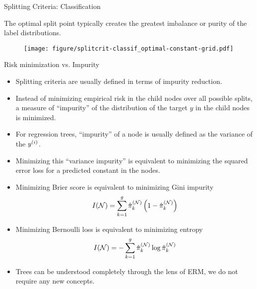 \documentclass[11pt,compress,t,notes=noshow, xcolor=table]{beamer}
\begin{document}
\begin{frame}[b]{Splitting Criteria: Classification}

The optimal split point typically creates the greatest imbalance or purity of the label distributions.

\vspace{0.5cm}

\begin{figure}[b]
    \centering
  \texttt{[image: figure/splitcrit-classif\_optimal-constant-grid.pdf]}
\end{figure}
\end{frame}

\begin{vbframe}{Risk minimization vs. Impurity}

\begin{itemize}
\item Splitting criteria are usually defined in terms of impurity reduction. 
\item Instead of minimizing empirical risk in the child nodes over all possible splits, a measure of \enquote{impurity} of the distribution of the target $y$ in the child nodes is minimized. 
\item For regression trees, \enquote{impurity} of a node is usually defined as the variance of the $y^{(i)}$. 
\item Minimizing this \enquote{variance impurity} is equivalent to minimizing the squared error loss for a predicted constant in the nodes. 

\framebreak 

\item Minimizing Brier score is equivalent to minimizing  Gini impurity
$$I(\mathcal{N}) = \sum\limits_{k=1}^g \hat\pi_k^{(\mathcal{N})} \left( 1-\hat\pi_k^{(\mathcal{N})} \right)$$
\item Minimizing Bernoulli loss is equivalent to minimizing entropy
$$I(\mathcal{N}) = -\sum\limits_{k=1}^g \hat\pi_k^{(\mathcal{N})} \log \hat\pi_k^{(\mathcal{N})}$$
\item Trees can be understood completely through the lens of ERM, we do not require any new concepts.
\end{itemize}
\end{vbframe}
\end{document}
